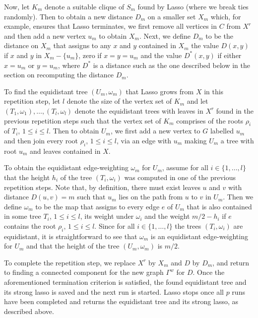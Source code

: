 Now, let $K_m$ denote a suitable clique of $S_m$ found by {\sc Lasso} (where
we break ties randomly).  Then to obtain a new distance $D_m$ on a smaller set
$X_m$ which, for example, ensures that {\sc Lasso} terminates, we first remove
all vertices in $C$ from $X^r$ and then add a new vertex $u_m$ to obtain
$X_m$. Next, we define $D_m$ to be the distance on $X_m$ that assigns to any
$x$ and $y$ contained in $X_m$ the value $D(x,y)$ if $x$ and $y$ in
$X_m-\{u_m\}$, zero if $x=y=u_m$ and the value $D^*(x,y)$ if either $x=u_m$ or
$y=u_m$, where $D^*$ is a distance such as the one described below in the
section on recomputing the distance $D_m$.

To find the equidistant tree $(U_m,\omega_m) $ that {\sc Lasso} grows from $X$
in this repetition step, let $l$ denote the size of the vertex set of $K_m$
and let $(T_1,\omega_1),\ldots, (T_l,\omega_l)$ denote the equidistant trees
with leaves in $X^r$ found in the previous repetition steps such that the
vertex set of $K_m$ comprises of the roots $\rho_i$ of $T_i$, $1\leq i\leq
l$. Then to obtain $U_m$, we first add a new vertex to $G$ labelled $u_m$ and
then join every root $\rho_i$, $1\leq i\leq l$, via an edge with $u_m$ making
$U_m$ a tree with root $u_m$ and leaves contained in $X$.

To obtain the equidistant edge-weighting $\omega_m$ for $U_m$, assume for all
$i\in \{1,\ldots,l\}$ that the height $h_i$ of the tree $(T_i,\omega_i)$ was
computed in one of the previous repetition steps. Note that, by definition,
there must exist leaves $u$ and $v$ with distance $D(u,v)=m$ such that $u_m$
lies on the path from $u$ to $v$ in $U_m$. Then we define $\omega_m$ to be the
map that assigns to every edge $e$ of $U_m$ that is also contained in some
tree $T_i$, $1\leq i\leq l$, its weight under $\omega_i$ and the weight
$m/2-h_i$ if $e$ contains the root $\rho_i$, $1\leq i\leq l$. Since for all
$i\in \{1,\ldots,l\}$ the trees $(T_i,\omega_i)$ are equidistant, it is
straightforward to see that $\omega_m$ is an equidistant edge-weighting for
$U_m$ and that the height of the tree $(U_m,\omega_m) $ is $m/2$.

To complete the repetition step, we replace $X^r$ by $X_m$ and $D$ by $D_m$,
and return to finding a connected component for the new graph $\Gamma^w$ for
$D$. Once the aforementioned termination criterion is satisfied, the found
equidistant tree and its strong lasso is saved and the next run is
started. {\sc Lasso} stops once all $p$ runs have been completed and returns
the equidistant tree and its strong lasso, as described above.

